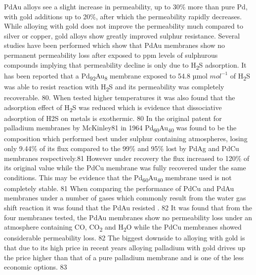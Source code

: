 PdAu alloys see a slight increase in permeability,  up to 30\% more than pure Pd, with gold 
additions up to 20\%, after which the permeability rapidly decreases. While alloying with 
gold does not improve the permeability much compared to silver or copper, gold alloys show 
greatly improved sulphur resistance. Several studies have been performed which show that PdAu 
membranes show no permanent permeability loss after exposed to ppm levels of sulphurous 
compounds implying that permeability decline is only due to H\textsubscript{2}S adsorption. 
It has been reported that a Pd\textsubscript{92}Au\textsubscript{8} membrane exposed to 
54.8 µmol $mol^{-1}$ of H\textsubscript{2}S was able to resist reaction with H\textsubscript{2}S and its permeability was 
completely recoverable. 80. When tested higher temperatures it was also found that the 
adsorption effect of H\textsubscript{2}S was reduced which is evidence that dissociative adsorption of H2S 
on metals is exothermic. 80 In the original patent for palladium membranes by  McKinley81 
in 1964 Pd\textsubscript{60}Au\textsubscript{40} was found to be the composition which performed best under sulphur 
containing atmospheres, losing only 9.44\% of its flux compared to the 99\% and 95\% lost by 
PdAg and PdCu membranes respectively.81 However under recovery the flux increased to 120\% 
of its original value while the PdCu membrane was fully recovered under the same conditions. 
This may be evidence that the Pd\textsubscript{60}Au\textsubscript{40} membrane used is not completely stable. 81 When 
comparing the performance of PdCu and PdAu membranes under a number of gases which commonly 
result from the water gas shift reaction it was found that the PdAu resisted . 82 
It was found that from the four membranes tested, the PdAu membranes show no permeability 
loss under an atmosphere containing CO, CO\textsubscript{2} and H\textsubscript{2}O while the PdCu membranes showed 
considerable permeability loss. 82 The biggest downside to alloying with gold is that 
due to its high price in recent years alloying palladium with gold drives up the price 
higher than that of a pure palladium membrane and is one of the less economic options. 83

